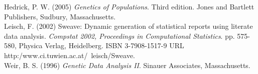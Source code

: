 \documentclass[a4paper]{article}
\begin{document}
Hedrick, P. W. (2005) {\it Genetics of Populations}. Third edition. Jones and Bartlett Publishers,
Sudbury, Massachusetts.\\

Leisch, F. (2002) Sweave: Dynamic generation of statistical reports using literate data analysis.
{\it Compstat 2002, Proceedings in Computational Statistics}. pp. 575-580, Physica Verlag, Heidelberg.
ISBN 3-7908-1517-9 URL http:/www.ci.tuwien.ac.at/~leisch/Sweave.\\

Weir, B. S. (1996) {\it Genetic Data Analysis II}. Sinauer Associates, Massachusetts.\\
\end{document}
